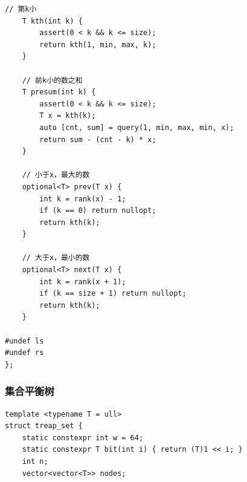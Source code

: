 \documentclass[UTF8, twoside]{ctexart}
\begin{document}
\begin{sloppypar}
\begin{lstlisting}[style=cpp]
    // 第k小
    T kth(int k) {
        assert(0 < k && k <= size);
        return kth(1, min, max, k);
    }

    // 前k小的数之和
    T presum(int k) {
        assert(0 < k && k <= size);
        T x = kth(k);
        auto [cnt, sum] = query(1, min, max, min, x);
        return sum - (cnt - k) * x;
    }

    // 小于x，最大的数
    optional<T> prev(T x) {
        int k = rank(x) - 1;
        if (k == 0) return nullopt;
        return kth(k);
    }

    // 大于x，最小的数
    optional<T> next(T x) {
        int k = rank(x + 1);
        if (k == size + 1) return nullopt;
        return kth(k);
    }

#undef ls
#undef rs
};
\end{lstlisting}
\subsubsection{集合平衡树}

\begin{lstlisting}[style=cpp]
template <typename T = ull>
struct treap_set {
    static constexpr int w = 64;
    static constexpr T bit(int i) { return (T)1 << i; }
    int n;
    vector<vector<T>> nodes;


\end{lstlisting}
\end{sloppypar}
\end{document}
